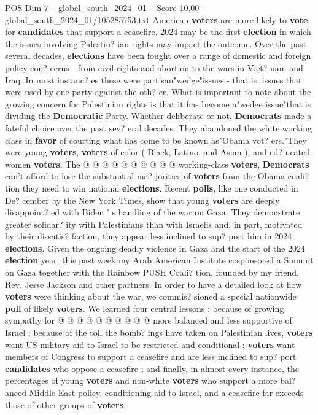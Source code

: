 \begin{textsample}{POS Dim 7 – global\_south\_2024\_01 – Score 10.00 – global\_south\_2024\_01/105285753.txt}  \label{ex:f7_pos_307}
American \textbf{voters} are more likely to \textbf{vote} for \textbf{candidates} that support a ceasefire. 2024 may be the first \textbf{election} in which the issues involving Palestin? ian rights may impact the outcome.
Over the past several decades, \textbf{elections} have been fought over a range of domestic and foreign policy con? cerns - from civil rights and abortion to the wars in Viet? nam and Iraq.
In most instanc? es these were partisan"wedge"issues - that is, issues that were used by one party against the oth? er.
What is important to note about the growing concern for Palestinian rights is that it has become a"wedge issue"that is dividing the \textbf{Democratic} Party.
Whether deliberate or not, \textbf{Democrats} made a fateful choice over the past sev? eral decades.
They abandoned the white working class in \textbf{favor} of courting what has come to be known as"Obama vot? ers."They were young \textbf{voters}, \textbf{voters} of color ( Black, Latino, and Asian ), and ed? ucated women \textbf{voters}.
The @ @ @ @ @ @ @ @ @ @ working-class \textbf{voters}, \textbf{Democrats} can't afford to lose the substantial ma? jorities of \textbf{voters} from the Obama coali? tion they need to win national \textbf{elections}.
Recent \textbf{polls}, like one conducted in De? cember by the New York Times, show that young \textbf{voters} are deeply disappoint? ed with Biden ' s handling of the war on Gaza.
They demonstrate greater solidar? ity with Palestinians than with Israelis and, in part, motivated by their dissatis? faction, they appear less inclined to sup? port him in 2024 \textbf{elections}.
Given the ongoing deadly violence in Gaza and the start of the 2024 \textbf{election} year, this past week my Arab American Institute cosponsored a Summit on Gaza together with the Rainbow PUSH Coali? tion, founded by my friend, Rev.
Jesse Jackson and other partners.
In order to have a detailed look at how \textbf{voters} were thinking about the war, we commis? sioned a special nationwide \textbf{poll} of likely \textbf{voters}.
We learned four central lessons : because of growing sympathy for @ @ @ @ @ @ @ @ @ @ more balanced and less supportive of Israel ; because of the toll the bomb? ings have taken on Palestinian lives, \textbf{voters} want US military aid to Israel to be restricted and conditional ; \textbf{voters} want members of Congress to support a ceasefire and are less inclined to sup? port \textbf{candidates} who oppose a ceasefire ; and finally, in almost every instance, the percentages of young \textbf{voters} and non-white \textbf{voters} who support a more bal? anced Middle East policy, conditioning aid to Israel, and a ceasefire far exceeds those of other groups of \textbf{voters}.

\end{textsample}
